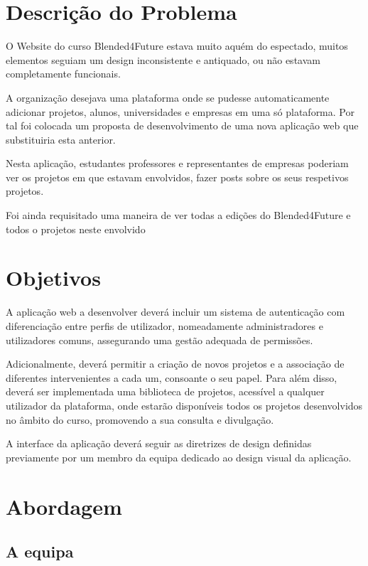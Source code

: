 \section{Descrição do Problema}
\label{sec:introducao_descproblema}

O Website do curso Blended4Future estava muito aquém do espectado, muitos elementos seguiam um design inconsistente e antiquado, ou não estavam completamente funcionais. 

A organização desejava uma plataforma onde se pudesse automaticamente adicionar projetos, alunos, universidades e empresas em uma só plataforma. Por tal foi colocada um proposta de desenvolvimento de uma nova aplicação web que substituiria esta anterior. 

Nesta aplicação, estudantes professores e representantes de empresas poderiam ver os projetos em que estavam envolvidos, fazer posts sobre os seus respetivos projetos.

Foi ainda requisitado uma maneira de ver todas a edições do Blended4Future e todos o projetos neste envolvido

\section{Objetivos}

A aplicação web a desenvolver deverá incluir um sistema de autenticação com diferenciação entre perfis de utilizador, nomeadamente administradores e utilizadores comuns, assegurando uma gestão adequada de permissões. 

Adicionalmente, deverá permitir a criação de novos projetos e a associação de diferentes intervenientes a cada um, consoante o seu papel. Para além disso, deverá ser implementada uma biblioteca de projetos, acessível a qualquer utilizador da plataforma, onde estarão disponíveis todos os projetos desenvolvidos no âmbito do curso, promovendo a sua consulta e divulgação.

A interface da aplicação deverá seguir as diretrizes de design definidas previamente por um membro da equipa dedicado ao design visual da aplicação.


\section{Abordagem}

\subsection{A equipa}

